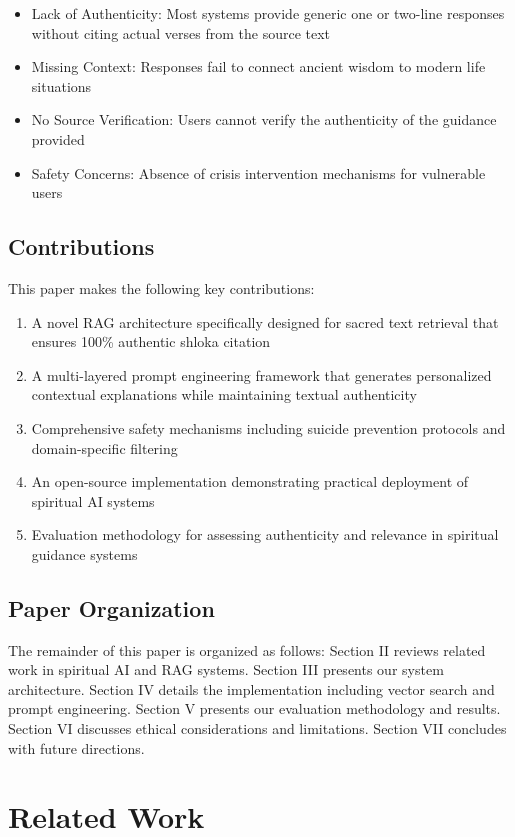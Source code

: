 \documentclass[conference]{IEEEtran}
\begin{document}
\begin{itemize}
    \item Lack of Authenticity: Most systems provide generic one or two-line responses without citing actual verses from the source text
    \item Missing Context: Responses fail to connect ancient wisdom to modern life situations
    \item No Source Verification: Users cannot verify the authenticity of the guidance provided
    \item Safety Concerns: Absence of crisis intervention mechanisms for vulnerable users
\end{itemize}

\subsection{Contributions}
This paper makes the following key contributions:

\begin{enumerate}
    \item A novel RAG architecture specifically designed for sacred text retrieval that ensures 100\% authentic shloka citation
    \item A multi-layered prompt engineering framework that generates personalized contextual explanations while maintaining textual authenticity
    \item Comprehensive safety mechanisms including suicide prevention protocols and domain-specific filtering
    \item An open-source implementation demonstrating practical deployment of spiritual AI systems
    \item Evaluation methodology for assessing authenticity and relevance in spiritual guidance systems
\end{enumerate}


\subsection{Paper Organization}
The remainder of this paper is organized as follows: Section II reviews related work in spiritual AI and RAG systems. Section III presents our system architecture. Section IV details the implementation including vector search and prompt engineering. Section V presents our evaluation methodology and results. Section VI discusses ethical considerations and limitations. Section VII concludes with future directions.

\section{Related Work}
\end{document}
